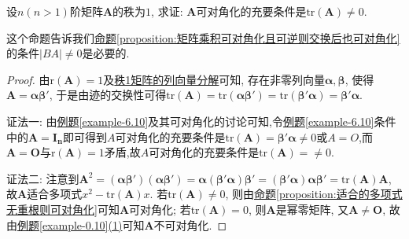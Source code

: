 \documentclass[../../main.tex]{subfiles}
\begin{document}
\begin{proposition}\label{proposition:矩阵可对角化迹必不为零}
设\(n(n > 1)\)阶矩阵\(\boldsymbol{A}\)的秩为\(1\), 求证: \(\boldsymbol{A}\)可对角化的充要条件是\(\mathrm{tr}(\boldsymbol{A})\neq 0\).
\end{proposition}
\begin{note}
这个命题告诉我们\hyperref[proposition:矩阵乘积可对角化且可逆则交换后也可对角化]{命题\ref{proposition:矩阵乘积可对角化且可逆则交换后也可对角化}}的条件$|BA|\ne 0$是必要的.
\end{note}
\begin{proof}
由\(\mathrm{r}(\boldsymbol{A}) = 1\)及\hyperref[lemma:秩1矩阵的列向量分解]{秩1矩阵的列向量分解}可知, 存在非零列向量\(\boldsymbol{\alpha},\boldsymbol{\beta}\), 使得\(\boldsymbol{A} = \boldsymbol{\alpha}\boldsymbol{\beta}'\), 于是由迹的交换性可得\(\mathrm{tr}(\boldsymbol{A}) = \mathrm{tr}(\boldsymbol{\alpha}\boldsymbol{\beta}') = \mathrm{tr}(\boldsymbol{\beta}'\boldsymbol{\alpha}) = \boldsymbol{\beta}'\boldsymbol{\alpha}\).

{\color{blue}证法一:}
由\hyperref[example-6.10]{例题\ref{example-6.10}}及其可对角化的讨论可知,令\hyperref[example-6.10]{例题\ref{example-6.10}}条件中的$\boldsymbol{A}=\boldsymbol{I_n}$即可得到$A$可对角化的充要条件是$\mathrm{tr}(\boldsymbol{A})=\boldsymbol{\beta}'\boldsymbol{\alpha}\ne 0$或$A=O$,而$\boldsymbol{A}=\boldsymbol{O}$与$\mathrm{r}(\boldsymbol{A}) = 1$矛盾,故$A$可对角化的充要条件是$\mathrm{tr}(\boldsymbol{A})=\ne 0$.

{\color{blue}证法二:}
注意到\(\boldsymbol{A}^2 = (\boldsymbol{\alpha}\boldsymbol{\beta}')(\boldsymbol{\alpha}\boldsymbol{\beta}') = \boldsymbol{\alpha}(\boldsymbol{\beta}'\boldsymbol{\alpha})\boldsymbol{\beta}' = (\boldsymbol{\beta}'\boldsymbol{\alpha})\boldsymbol{\alpha}\boldsymbol{\beta}' = \mathrm{tr}(\boldsymbol{A})\boldsymbol{A}\), 故\(\boldsymbol{A}\)适合多项式\(x^2-\mathrm{tr}(\boldsymbol{A})x\). 若\(\mathrm{tr}(\boldsymbol{A})\neq 0\), 则由\hyperref[proposition:适合的多项式无重根则可对角化]{命题\ref{proposition:适合的多项式无重根则可对角化}}可知\(\boldsymbol{A}\)可对角化; 若\(\mathrm{tr}(\boldsymbol{A}) = 0\), 则\(\boldsymbol{A}\)是幂零矩阵, 又\(\boldsymbol{A}\neq \boldsymbol{O}\), 故由\hyperref[example-0.10]{例题\ref{example-0.10}(1)}可知\(\boldsymbol{A}\)不可对角化.
\end{proof}
\end{document}
